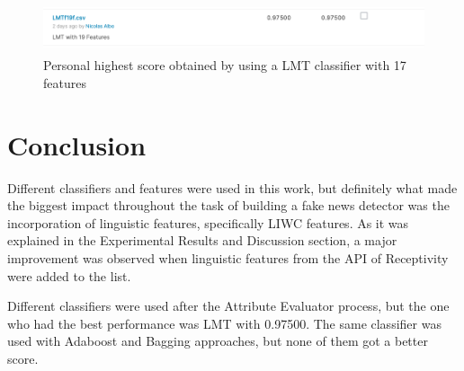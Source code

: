 \documentclass[runningheads]{llncs}
\begin{document}
\begin{figure}[hbt!]
\centering
\includegraphics[width=12cm, height=1.5cm]{LMT.png}
\caption{Personal highest score obtained by using a LMT classifier with 17 features}
\end{figure}

\section{Conclusion}
Different classifiers and features were used in this work, but definitely what made the biggest impact throughout the task of building a fake news detector was the incorporation of linguistic features, specifically LIWC features. As it was explained in the Experimental Results and Discussion section, a major improvement was observed when linguistic features from the API of Receptivity were added to the list.

Different classifiers were used after the Attribute Evaluator process, but the one who had the best performance was LMT with 0.97500. The same classifier was used with Adaboost and Bagging approaches, but none of them got a better score.

%
%
%
% 
% 
%
\printbibliography
\end{document}
